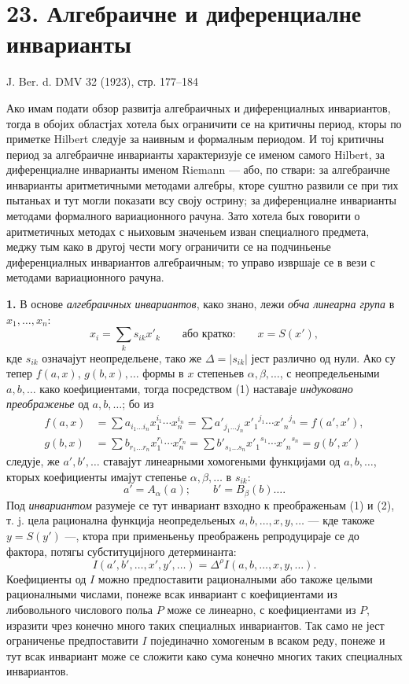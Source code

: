 ﻿\documentclass[11pt]{article}
\providecommand{\D}{\Delta}
\begin{document}
\setcounter{footnote}{0}
\section*{23. Алгебраичне и диференциалне инварианты}
\begin{center}
J. Ber. d. DMV 32 (1923), стр. 177--184
\end{center}

Ако имам подати обзор развитја алгебраичных и диференциалных инвариантов, тогда в обојих областјах хотела бых ограничити се на критичны период, кторы по приметке Hilbert следује за наивным и формалным периодом. И тој критичны период за алгебраичне инварианты характеризује се именом самого Hilbert, за диференциалне инварианты именом Riemann --- або, по ствари: за алгебраичне инварианты аритметичными методами алгебры, кторе суштно развили се при тих пытаньах и тут могли показати всу своју острину; за диференциалне инварианты методами формалного вариационного рачуна. Зато хотела бых говорити о аритметичных методах с ньиховым значеньем изван специалного предмета, меджу тым како в другој чести могу ограничити се на подчиньенье диференциалных инвариантов алгебраичным; то управо извршаје се в вези с методами вариационного рачуна.

\textbf{1.} В основе \emph{алгебраичных инвариантов}, како знано, лежи \emph{обча линеарна група} в $x_1,\ldots,x_n$:
\[
\tag{1}
x_i=\sum_k s_{ik}x'_k
\qquad\text{або кратко:}\qquad
x=S(x'),
\]
кде $s_{ik}$ означајут неопредельене, тако же $\D=|s_{ik}|$ јест различно од нули. Ако су тепер $f(a,x)$, $g(b,x),\ldots$ формы в $x$ степеньев $\alpha,\beta,\ldots$, с неопредельеными $a,b,\ldots$ како коефициентами, тогда посредством (1) наставаје \emph{индуковано преображенье} од $a,b,\ldots$; бо из
\[
\begin{aligned}
f(a,x)&=\sum a_{i_1\ldots i_n}x_1^{i_1}\cdots x_n^{i_n}
      =\sum a'_{j_1\ldots j_n}{x'_1}^{j_1}\cdots {x'_n}^{j_n}
      =f(a',x'),\\
g(b,x)&=\sum b_{r_1\ldots r_n}x_1^{r_1}\cdots x_n^{r_n}
      =\sum b'_{s_1\ldots s_n}{x'_1}^{s_1}\cdots {x'_n}^{s_n}
      =g(b',x')
\end{aligned}
\]
следује, же $a',b',\ldots$ ставајут линеарными хомогеными функцијами од $a,b,\ldots$, кторых коефициенты имајут степенье $\alpha,\beta,\ldots$ в $s_{ik}$:
\[
\tag{2}
a'=A_\alpha(a);\qquad b'=B_\beta(b)\ldots .
\]
Под \emph{инвариантом} разумеје се тут инвариант взходно к преображеньам (1) и (2), т. j. цела рационална функција неопредельеных $a,b,\ldots,x,y,\ldots$ --- кде такоже $y=S(y')$ ---, ктора при применьеньу преображень репродуцираје се до фактора, потягы субституцијного детерминанта:
\[
\tag{3}
I(a',b',\ldots,x',y',\ldots)=\D^\rho I(a,b,\ldots,x,y,\ldots).
\]
Коефициенты од $I$ можно предпоставити рационалными або такоже целыми рационалными числами, понеже всак инвариант с коефициентами из либовольного числового польа $P$ може се линеарно, с коефициентами из $P$, изразити чрез конечно много таких специалных инвариантов. Так само не јест ограниченье предпоставити $I$ појединачно хомогеным в всаком реду, понеже и тут всак инвариант може се сложити како сума конечно многих таких специалных инвариантов.
\end{document}
